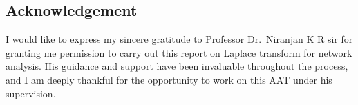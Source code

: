 \documentclass[
]{article}
\begin{document}
\hypertarget{acknowledgement}{%
\subsection{Acknowledgement}\label{acknowledgement}}

I would like to express my sincere gratitude to Professor Dr.~Niranjan K
R sir for granting me permission to carry out this report on Laplace
transform for network analysis. His guidance and support have been
invaluable throughout the process, and I am deeply thankful for the
opportunity to work on this AAT under his supervision.
\end{document}
